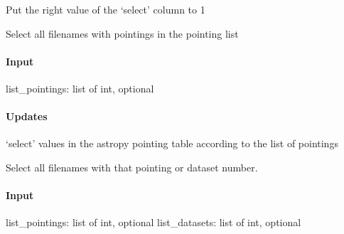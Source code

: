\documentclass[letterpaper,10pt,english]{sphinxmanual}
\begin{document}
\begin{fulllineitems}
\begin{fulllineitems}
\begin{description}
\end{description}

\sphinxAtStartPar
Put the right value of the ‘select’ column to 1

\end{fulllineitems}


\begin{fulllineitems}
\label{\detokenize{api/pymusepipe:pymusepipe.util_image.PointingTable.select_pointings}}
\pysigstartsignatures
{}
\pysigstopsignatures
\sphinxAtStartPar
Select all filenames with pointings in the pointing list


\paragraph{Input}
\label{\detokenize{api/pymusepipe:id132}}
\sphinxAtStartPar
list\_pointings: list of int, optional


\paragraph{Updates}
\label{\detokenize{api/pymusepipe:id133}}
\sphinxAtStartPar
‘select’ values in the astropy pointing table according to the list of pointings

\end{fulllineitems}


\begin{fulllineitems}
\label{\detokenize{api/pymusepipe:pymusepipe.util_image.PointingTable.select_pointings_and_datasets}}
\pysigstartsignatures
{}
\pysigstopsignatures
\sphinxAtStartPar
Select all filenames with that pointing or dataset number.


\paragraph{Input}
\label{\detokenize{api/pymusepipe:id134}}
\sphinxAtStartPar
list\_pointings: list of int, optional
list\_datasets: list of int, optional



\end{fulllineitems}
\end{fulllineitems}
\end{document}
